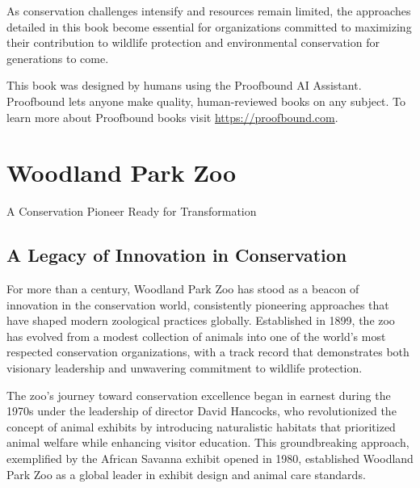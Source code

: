 \documentclass[
  Letterpaper,
]{scrbook}
\begin{document}
As conservation challenges intensify and resources remain limited, the
approaches detailed in this book become essential for organizations
committed to maximizing their contribution to wildlife protection and
environmental conservation for generations to come.

\begin{tcolorbox}[enhanced jigsaw, breakable, colback=white, leftrule=.75mm, toprule=.15mm, left=2mm, toptitle=1mm, arc=.35mm, titlerule=0mm, rightrule=.15mm, colframe=quarto-callout-note-color-frame, colbacktitle=quarto-callout-note-color!10!white, opacityback=0, bottomtitle=1mm, title=\textcolor{quarto-callout-note-color}{\faInfo}\hspace{0.5em}{About This Book}, bottomrule=.15mm, coltitle=black, opacitybacktitle=0.6]

This book was designed by humans using the Proofbound AI Assistant.
Proofbound lets anyone make quality, human-reviewed books on any
subject. To learn more about Proofbound books visit
\url{https://proofbound.com}.

\end{tcolorbox}


\chapter{Woodland Park Zoo}\label{woodland-park-zoo}

A Conservation Pioneer Ready for Transformation

\hfill\break

\section{A Legacy of Innovation in
Conservation}\label{a-legacy-of-innovation-in-conservation}

For more than a century, Woodland Park Zoo has stood as a beacon of
innovation in the conservation world, consistently pioneering approaches
that have shaped modern zoological practices globally. Established in
1899, the zoo has evolved from a modest collection of animals into one
of the world's most respected conservation organizations, with a track
record that demonstrates both visionary leadership and unwavering
commitment to wildlife protection.

The zoo's journey toward conservation excellence began in earnest during
the 1970s under the leadership of director David Hancocks, who
revolutionized the concept of animal exhibits by introducing
naturalistic habitats that prioritized animal welfare while enhancing
visitor education. This groundbreaking approach, exemplified by the
African Savanna exhibit opened in 1980, established Woodland Park Zoo as
a global leader in exhibit design and animal care standards.
\end{document}
